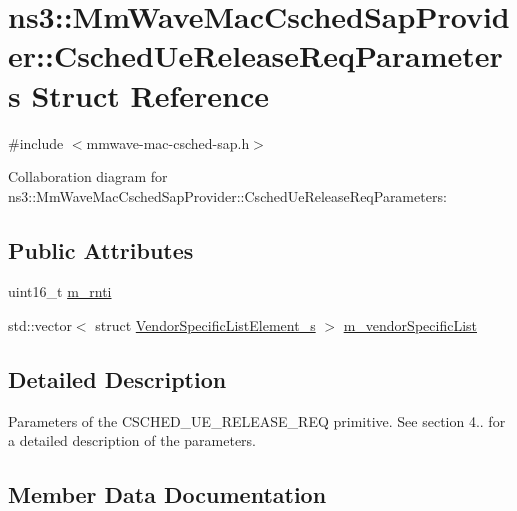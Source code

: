 \hypertarget{structns3_1_1MmWaveMacCschedSapProvider_1_1CschedUeReleaseReqParameters}{}\section{ns3\+:\+:Mm\+Wave\+Mac\+Csched\+Sap\+Provider\+:\+:Csched\+Ue\+Release\+Req\+Parameters Struct Reference}
\label{structns3_1_1MmWaveMacCschedSapProvider_1_1CschedUeReleaseReqParameters}


{\ttfamily \#include $<$mmwave-\/mac-\/csched-\/sap.\+h$>$}



Collaboration diagram for ns3\+:\+:Mm\+Wave\+Mac\+Csched\+Sap\+Provider\+:\+:Csched\+Ue\+Release\+Req\+Parameters\+:
\subsection*{Public Attributes}
\begin{DoxyCompactItemize}
\item 
uint16\+\_\+t \hyperlink{structns3_1_1MmWaveMacCschedSapProvider_1_1CschedUeReleaseReqParameters_a538a326b6ac71cdd9ce19e291bdf31a7}{m\+\_\+rnti}
\item 
std\+::vector$<$ struct \hyperlink{structns3_1_1VendorSpecificListElement__s}{Vendor\+Specific\+List\+Element\+\_\+s} $>$ \hyperlink{structns3_1_1MmWaveMacCschedSapProvider_1_1CschedUeReleaseReqParameters_a1ffff42a1429147ed09a2b0254fff88a}{m\+\_\+vendor\+Specific\+List}
\end{DoxyCompactItemize}


\subsection{Detailed Description}
Parameters of the C\+S\+C\+H\+E\+D\+\_\+\+U\+E\+\_\+\+R\+E\+L\+E\+A\+S\+E\+\_\+\+R\+EQ primitive. See section 4.. for a detailed description of the parameters. 

\subsection{Member Data Documentation}
